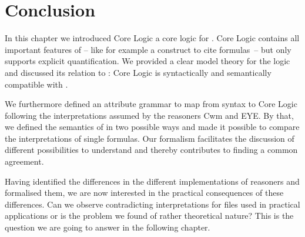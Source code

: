 \section{Conclusion}

In this chapter we introduced \nthree Core Logic a core logic for \nthree.  \nthree Core Logic contains all important features of 
\nthree{} -- like for example a construct to cite formulas~-- but only supports explicit quantification. 
We provided a clear model theory for the logic and discussed its relation to \rdf: \nthree Core Logic is syntactically and semantically compatible  with \rdf.

We furthermore defined an attribute grammar
to map from \nthree syntax to \nthree Core Logic following the interpretations assumed by the reasoners Cwm and EYE. 
By that, we defined the semantics of \nthree in two possible ways and made it possible to compare the interpretations of single formulas.
Our formalism facilitates the discussion of different possibilities to understand \nthree and thereby contributes to finding a common agreement.

Having identified the differences in the different implementations of \nthree reasoners and formalised them, we are now interested in the practical consequences of these 
differences. Can we observe contradicting interpretations for files used in practical applications or is the problem we found of rather theoretical 
nature? This is the question we are going to answer in the following chapter.

